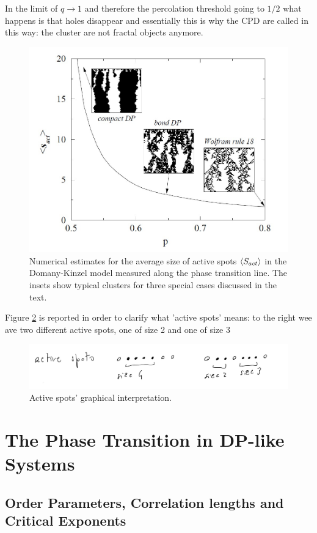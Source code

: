 \documentclass[\main/main.tex]{subfiles}
\begin{document}
In the limit of $q\to 1$ and therefore the percolation threshold going to $1/2$ what happens is that holes disappear and essentially this is why the CPD are called in this way: the cluster are not fractal objects anymore.

\begin{figure}[ht]
    \centering
    \includegraphics[width=0.7\linewidth]{Lectures/Images/clusters.jpg}
    \caption{Numerical estimates for the average size of active spots $\left\langle S_{act} \right\rangle$ in the Domany-Kinzel model measured along the phase transition line. The insets show typical clusters for three special cases discussed
in the text.}
    \label{fig:clusters}
\end{figure}

Figure \ref{fig:as} is reported in order to clarify what 'active spots' means: to the right wee ave two different active spots, one of size 2 and one of size 3

\begin{figure}[ht]
    \centering
    \includegraphics[width=0.9\linewidth]{Lectures/Images/as.jpg}
    \caption{Active spots' graphical interpretation.}
    \label{fig:as}
\end{figure}

\section{The Phase Transition in DP-like Systems}
\subsection{Order Parameters, Correlation lengths and Critical Exponents}
\end{document}
